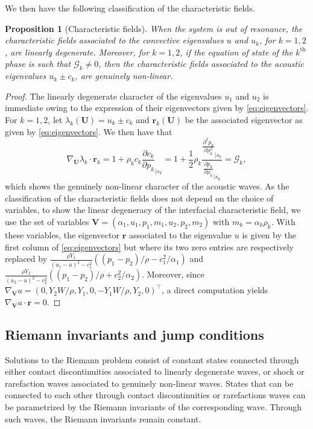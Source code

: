 \documentclass{myclass}
\newtheorem{proposition}{\bf Proposition}[section]
\begin{document}
We then have the following classification of the characteristic fields.

\begin{proposition}[Characteristic fields]\label{prop:characteristic_fields} When the system is out of resonance, the characteristic fields associated to the convective eigenvalues $u$ and $u_k$, for $k=1,2$, are linearly degenerate. Moreover, for $k=1,2$, if the equation of state of the $k^\text{th}$ phase is such that $\mathcal{G}_k\neq 0$, then the characteristic fields associated to the acoustic eigenvalues $u_k\pm c_k$, are genuinely non-linear.
\end{proposition}
\begin{proof}
The linearly degenerate character of the eigenvalues $u_1$ and $u_2$ is immediate owing to the expression of their eigenvectors given by \eqref{eq:eigenvectors}. For $k=1,2$, let $\lambda_k(\bm{U})=u_k\pm c_k$ and $\bm{r}_k(\bm{U})$ be the associated eigenvector as given by \eqref{eq:eigenvectors}. We then have that
\begin{equation}
\nabla_{\bm{U}}\lambda_k\cdot\bm{r}_k = 1 + \rho_k c_k \frac{\partial c_k}{\partial p_k}_{|s_k} = 1 + \frac{1}{2}\rho_k\frac{\tfrac{\partial^2 p_k}{\partial \rho_k^2}_{|s_k}}{\tfrac{\partial p_k }{ \partial \rho_k}_{|s_k}} = \mathcal{G}_k,
\end{equation}
which shows the genuinely non-linear character of the acoustic waves. As the classification of the characteristic fields does not depend on the choice of variables, to show the linear degeneracy of the interfacial characteristic field, we use the set of variables $\bm{V}=(\alpha_1, u_1, p_1, m_1, u_2, p_2, m_2)$ with $m_k=\alpha_k \rho_k$. With these variables, the eigenvector $\bm{r}$ associated to the eigenvalue $u$ is given by the first column of \eqref{eq:eigenvectors} but where its two zero entries are respectively replaced by $\frac{\rho Y_1}{(u_1-u)^2-c_1^2}((p_1-p_2)/\rho - c_1^2/\alpha_1)$ and $\frac{\rho Y_2}{(u_2-u)^2-c_2^2}((p_1-p_2)/\rho + c_2^2/\alpha_2)$. Moreover, since 
$\nabla_{\bm{V}}u=(0, Y_2 W/\rho, Y_1, 0, -Y_1 W/\rho, Y_2, 0)^\top$, a direct computation yields $\nabla_{\bm{V}}u\cdot\bm{r}=0$.
\end{proof}


\subsection{Riemann invariants and jump conditions}

Solutions to the Riemann problem consist of constant states connected through either contact discontinuities associated to linearly degenerate waves, or shock or rarefaction waves associated to genuinely non-linear waves.
States that can be connected to each other through contact discontinuities or rarefactions waves can be parametrized by the Riemann invariants of the corresponding wave. Through such waves, the Riemann invariants remain constant.
\end{document}
